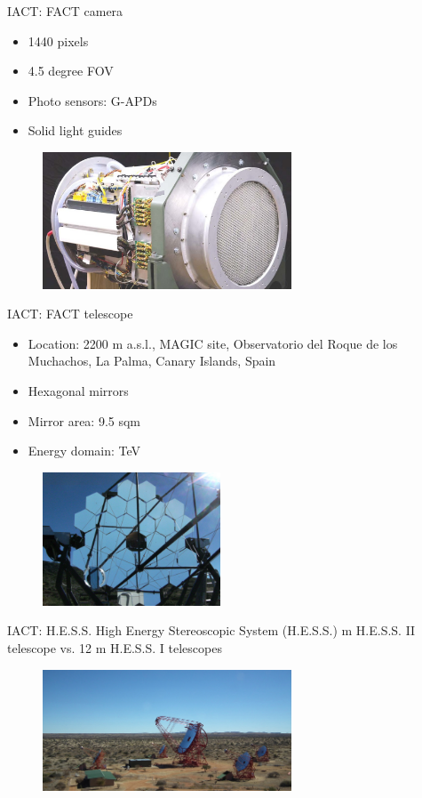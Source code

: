 \documentclass{beamer}
\begin{document}
\begin{frame}{IACT: FACT camera}
	\begin{itemize}
		\item 1440 pixels
		\item 4.5 degree FOV
		\item Photo sensors: G-APDs
		\item Solid light guides
	\end{itemize}
	\begin{figure}[h]
		\includegraphics[width=280px]{ICATcamera.jpg}
	\end{figure}
\end{frame}



\begin{frame}{IACT: FACT telescope}
	\begin{itemize}
		\item Location: 2200 m a.s.l., MAGIC site, Observatorio del Roque de los Muchachos, La Palma, Canary Islands, Spain
		\item Hexagonal mirrors
		\item Mirror area: 9.5 sqm
		\item Energy domain: TeV
	\end{itemize}
	\begin{figure}[h]
		\includegraphics[width=200px]{FACTtelescope.jpg}
	\end{figure}
\end{frame}

\begin{frame}{IACT: H.E.S.S.}
	High Energy Stereoscopic System (H.E.S.S.)
	 m H.E.S.S. II telescope vs. 12 m H.E.S.S. I telescopes
	\begin{figure}[h]
		\includegraphics[width=280px]{Array_overviewS.jpg}
	\end{figure}
\end{frame}
\end{document}
